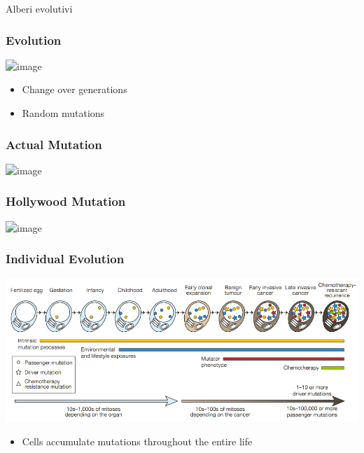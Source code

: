 \begin{frame}
  \titlepage

  \centering
  Alberi evolutivi
\end{frame}



\begin{frame}
\frametitle{Evolution}

\centering
\includegraphics<1>[height=0.6\textheight]{figures/evolution-desk-720x380.jpg}

\begin{itemize}
  \item
    Change over generations
  \item Random mutations
  \end{itemize}
\end{frame}




\begin{frame}
\frametitle{Actual Mutation}
 
\centering
\includegraphics<1>[height=0.6\textheight]{figures/dna_strand.jpg}

\end{frame}



\begin{frame}
\frametitle{Hollywood Mutation}

\centering
\includegraphics<1>[height=0.85\textheight]{figures/spiderman-spider-bite-comic}
\end{frame}


\begin{frame}
\frametitle{Individual Evolution}

\centering
  \includegraphics[width=\linewidth]{figures/progression}
  \begin{itemize}
    \item
      Cells \alert{accumulate} mutations throughout the entire life
  \end{itemize}
\end{frame}




